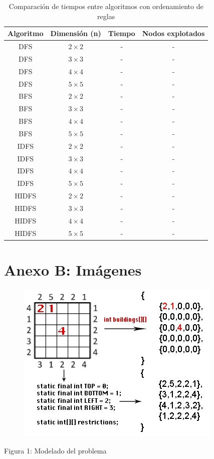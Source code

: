 \documentclass[%
	final,
	reprint,
	notitlepage,
	narroweqnarray,
	inline,
	twoside,
	invited
	]{ieee}
\begin{document}
\begin{table}[H]
\begin{center}
\begin{tabular}{|c|c|c|c|}
\hline
Algoritmo & Dimensión (n) & Tiempo & Nodos explotados\\
\hline
\hline

DFS & $2\times2$ & - & -\\
DFS & $3\times3$ & - & -\\
DFS & $4\times4$ & - & -\\
DFS & $5\times5$ & - & -\\
\hline
BFS & $2\times2$ & - & -\\
BFS & $3\times3$ & - & -\\
BFS & $4\times4$ & - & -\\
BFS & $5\times5$ & - & -\\
\hline
IDFS & $2\times2$ & - & -\\
IDFS & $3\times3$ & - & -\\
IDFS & $4\times4$ & - & -\\
IDFS & $5\times5$ & - & -\\
\hline
HIDFS & $2\times2$ & - & -\\
HIDFS & $3\times3$ & - & -\\
HIDFS & $4\times4$ & - & -\\
HIDFS & $5\times5$ & - & -\\

\hline  
\end{tabular}
\end{center}
\caption{Comparación de tiempos entre algoritmos con ordenamiento de reglas}
\label{tabla2}
\end{table}

\clearpage

\section*{Anexo B: Imágenes}

\begin{figure}[H]
\begin{center}
\includegraphics[scale=0.65]{./images/ModeladoSIA.jpg}
\label{modelado}
\end{center}
\end{figure}

\begin{center}
\par Figura 1: Modelado del problema
\end{center}


\end{document}
